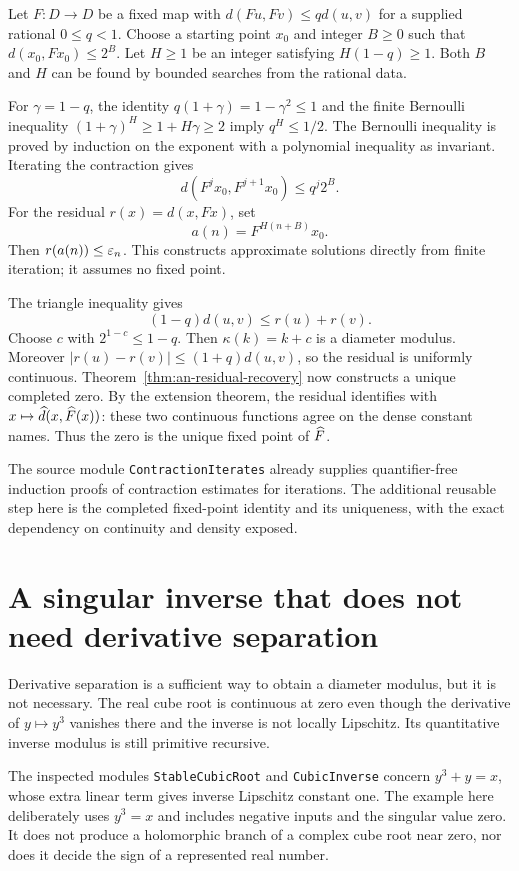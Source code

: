 Let $F:D\to D$ be a fixed map with
$d(Fu,Fv)\le qd(u,v)$ for a supplied rational $0\le q<1$.
Choose a starting point $x_0$ and integer $B\ge0$ such that
$d(x_0,Fx_0)\le2^B$.  Let $H\ge1$ be an integer satisfying
$H(1-q)\ge1$.  Both $B$ and $H$ can be found by bounded searches from
the rational data.

For $\gamma=1-q$, the identity
$q(1+\gamma)=1-\gamma^2\le1$ and the finite Bernoulli inequality
$(1+\gamma)^H\ge1+H\gamma\ge2$ imply $q^H\le1/2$.
The Bernoulli inequality is proved by induction on the exponent with
a polynomial inequality as invariant.  Iterating the contraction
gives
\[
 d(F^j x_0,F^{j+1}x_0)\le q^j2^B.
\]
For the residual $r(x)=d(x,Fx)$, set
\[
 a(n)=F^{H(n+B)}x_0.
\]
Then $r(a(n))\le\varepsilon_n$.  This constructs approximate solutions
directly from finite iteration; it assumes no fixed point.

The triangle inequality gives
\[
 (1-q)d(u,v)\le r(u)+r(v).
\]
Choose $c$ with $2^{1-c}\le1-q$.  Then
$\kappa(k)=k+c$ is a diameter modulus.
Moreover $|r(u)-r(v)|\le(1+q)d(u,v)$, so the residual is uniformly
continuous.  Theorem~\ref{thm:an-residual-recovery} now constructs a
unique completed zero.  By the extension theorem, the residual
identifies with $x\mapsto\widehat d(x,\widehat F(x))$: these two continuous
functions agree on the dense constant names.  Thus the zero is the
unique fixed point of $\widehat F$.

The source module \texttt{ContractionIterates} already supplies
quantifier-free induction proofs of contraction estimates for
iterations.  The additional reusable step here is the completed
fixed-point identity and its uniqueness, with the exact dependency
on continuity and density exposed.

\section{A singular inverse that does not need derivative separation}
\label{sec:singular-cube-root}

Derivative separation is a sufficient way to obtain a diameter
modulus, but it is not necessary.  The real cube root is continuous at
zero even though the derivative of $y\mapsto y^3$ vanishes there and
the inverse is not locally Lipschitz.  Its quantitative inverse
modulus is still primitive recursive.

The inspected modules \texttt{StableCubicRoot} and
\texttt{CubicInverse} concern $y^3+y=x$, whose extra linear term
gives inverse Lipschitz constant one.  The example here deliberately
uses $y^3=x$ and includes negative inputs and the singular value zero.
It does not produce a holomorphic branch of a complex cube root near
zero, nor does it decide the sign of a represented real number.

